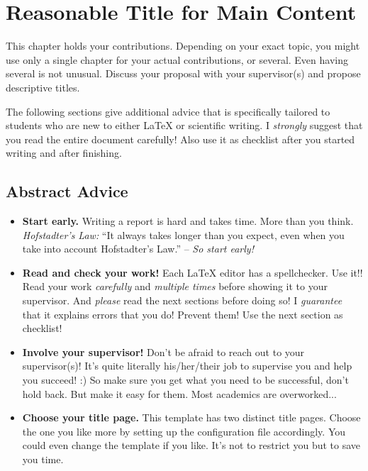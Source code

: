 \chapter{Reasonable Title for Main Content}\label{chap:content}

This chapter holds your contributions. Depending on your exact topic, you might use only a single chapter for your actual contributions, or several. Even having several is not unusual. Discuss your proposal with your supervisor(s) and propose descriptive titles. 

The following sections give additional advice that is specifically tailored to students who are new to either \LaTeX{} or scientific writing. I \emph{strongly} suggest that you read the entire document carefully! Also use it as checklist after you started writing and after finishing.


\section{Abstract Advice}

\begin{itemize}
 \item \textbf{Start early.} Writing a report is hard and takes time. More than you think. \emph{Hofstadter's Law:} ``It always takes longer than you expect, even when you take into account Hofstadter's Law.'' -- \emph{So start early!}
 \item \textbf{Read and check your work!} Each \LaTeX{} editor has a spellchecker. Use it!! Read your work \emph{carefully} and \emph{multiple times} before showing it to your supervisor. And \emph{please} read the next sections before doing so! I \emph{guarantee} that it explains errors that you do! Prevent them! Use the next section as checklist!
 \item \textbf{Involve your supervisor!} Don't be afraid to reach out to your supervisor(s)! It's quite literally his/her/their job to supervise you and help you succeed! :) So make sure you get what you need to be successful, don't hold back. But make it easy for them. Most academics are overworked...
 \item \textbf{Choose your title page.} This template has two distinct title pages. Choose the one you like more by setting up the configuration file accordingly. You could even change the template if you like. It's not to restrict you but to save you time.

\end{itemize}


